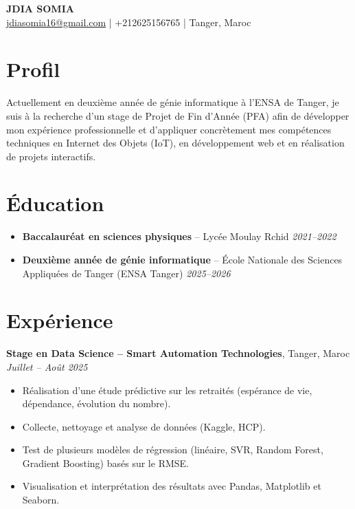 \documentclass[a4paper,11pt]{article}
\begin{document}
\begin{center}
    {\Huge \textbf{JDIA SOMIA}} \\[6pt]
    \href{mailto:jdiasomia16@gmail.com}{jdiasomia16@gmail.com} \quad|\quad
    +212625156765 \quad|\quad
    Tanger, Maroc
\end{center}

\vspace{6pt}

\section*{Profil}
Actuellement en deuxième année de génie informatique à l'ENSA de Tanger, je suis à la recherche d'un stage de Projet de Fin d'Année (PFA) afin de développer mon expérience professionnelle et d'appliquer concrètement mes compétences techniques en Internet des Objets (IoT), en développement web et en réalisation de projets interactifs.

\section*{Éducation}
\begin{itemize}[leftmargin=*, noitemsep]
    \item \textbf{Baccalauréat en sciences physiques} – Lycée Moulay Rchid \hfill \textit{2021–2022}
    \item \textbf{Deuxième année de génie informatique} – École Nationale des Sciences Appliquées de Tanger (ENSA Tanger) \hfill \textit{2025–2026}
\end{itemize}

\section*{Expérience}

\textbf{Stage en Data Science – Smart Automation Technologies}, Tanger, Maroc \hfill \textit{Juillet – Août 2025}
\begin{itemize}[leftmargin=*, noitemsep]
    \item Réalisation d'une étude prédictive sur les retraités (espérance de vie, dépendance, évolution du nombre).
    \item Collecte, nettoyage et analyse de données (Kaggle, HCP).
    \item Test de plusieurs modèles de régression (linéaire, SVR, Random Forest, Gradient Boosting) basés sur le RMSE.
    \item Visualisation et interprétation des résultats avec Pandas, Matplotlib et Seaborn.
\end{itemize}
\end{document}
